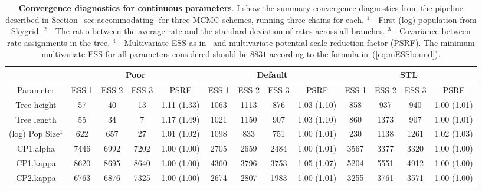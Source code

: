 \begin{sidewaystable}[!ht]
\caption[Convergence diagnostics for continuous parameters.]{\textbf{Convergence diagnostics for continuous parameters}.
I show the summary convergence diagnostics from the pipeline described in Section~\ref{sec:accommodating} for three MCMC schemes, running three chains for each.
$^1$ - First (log) population  from Skygrid.
$^2$ - The ratio between the average rate and the standard deviation of rates across all branches.
$^3$ - Covariance between rate assignments in the tree.
$^4$ - Multivariate ESS as in~\cite{Vats2015} and multivariate potential scale reduction factor (PSRF).
The minimum multivariate ESS for all parameters considered should be $8831$ according to the formula in~(\ref{eq:mESSbound}).
}
\label{tab:continuous_results}
\begin{center}
\small\addtolength{\tabcolsep}{-5pt}
 \begin{tabular}{ccccc|cccc|cccc}
\toprule
                         & \multicolumn{4}{c}{Poor}                  & \multicolumn{4}{c}{Default}               & \multicolumn{4}{c}{STL}                   \\
\midrule                         
Parameter                & ESS 1 & ESS 2 & ESS 3 & PSRF        & ESS 1 & ESS 2 & ESS 3 & PSRF        & ESS 1 & ESS 2 & ESS 3 & PSRF        \\
\midrule
Tree height              & 57      & 40      & 13      & 1.11 (1.33) & 1063    & 1113    & 876     & 1.03 (1.10) & 858     & 937     & 940     & 1.00 (1.01) \\
Tree length              & 55      & 34      & 7       & 1.17 (1.49) & 1021    & 1150    & 907     & 1.03 (1.10) & 860     & 1373    & 907     & 1.00 (1.01) \\
(log) Pop Size$^1$           & 622     & 657     & 27      & 1.01 (1.02) & 1098    & 833     & 751     & 1.00 (1.01) & 230     & 1138    & 1261    & 1.02 (1.03) \\
CP1.alpha                & 7446    & 6992    & 7202    & 1.00 (1.00) & 2705    & 2659    & 2484    & 1.00 (1.01) & 3567    & 3377    & 3320    & 1.00 (1.00) \\
CP1.kappa                & 8620    & 8695    & 8640    & 1.00 (1.00) & 4360    & 3796    & 3753    & 1.05 (1.07) & 5204    & 5551    & 4912    & 1.00 (1.00) \\
CP2.kappa                & 6763    & 6876    & 7325    & 1.00 (1.00) & 2674    & 2807    & 1983    & 1.00 (1.01) & 3255    & 3761    & 3571    & 1.00 (1.00) \\

\end{tabular}
\end{center}
\end{sidewaystable}
